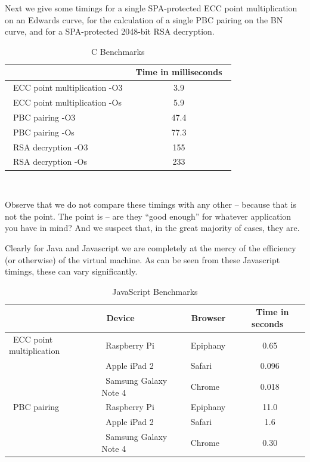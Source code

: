\documentclass{llncs}
\begin{document}
Next we give some timings for a single SPA-protected ECC point multiplication on an Edwards curve, for the calculation of a single PBC pairing on the BN curve, and for a SPA-protected 2048-bit RSA decryption.

\begin{table}
\centering
\begin{tabular}{|l|c|}
\hline
&~Time in milliseconds~\\
\hline
~ECC point multiplication -O3 & 3.9  \\ %
~ECC point multiplication -Os & 5.9 \\ %
~PBC pairing -O3 & 47.4 \\ %
~PBC pairing -Os & 77.3 \\ %
~RSA decryption -O3 & 155 \\  %
~RSA decryption -Os & 233 \\  %
\hline
\end{tabular}
~\\
\caption{C Benchmarks}
\label{cspeed}
\end{table}

Observe that we do not compare these timings with any other -- because that is not the point.
The point is -- are they ``good enough'' for whatever application you have in mind? And we suspect that, in the great majority of cases, they are.

Clearly for Java and Javascript we are completely at the mercy of the efficiency (or otherwise) of the virtual machine. As can be seen from these Javascript timings, these
can vary significantly.


\begin{table}
\centering
\begin{tabular}{|l|l|l|c|}
\hline
 & ~Device~ & ~Browser~ &~Time in seconds~\\
\hline
~ECC point multiplication~  & ~Raspberry Pi~ & ~Epiphany~ & 0.65  \\
  & ~Apple iPad 2~ & ~Safari~ & 0.096  \\
  & ~Samsung Galaxy Note 4~ & ~Chrome~ & 0.018  \\
~PBC pairing~  &  ~Raspberry Pi~ & ~Epiphany~ & 11.0\\
 &  ~Apple iPad 2~ & ~Safari~ & 1.6\\
 &  ~Samsung Galaxy Note 4~ & ~Chrome~ & 0.30\\
\hline
\end{tabular}
~\\
\caption{JavaScript Benchmarks}
\label{jsspeed}
\end{table}
\end{document}
